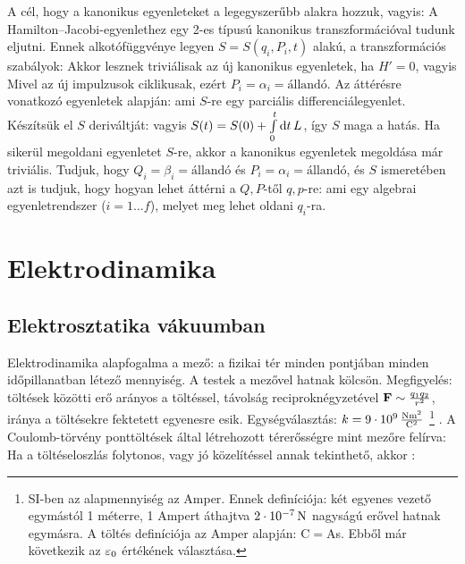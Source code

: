    A cél, hogy a kanonikus egyenleteket a legegyszerűbb alakra hozzuk, vagyis:
   A Hamilton--Jacobi-egyenlethez egy 2-es típusú kanonikus transzformációval tudunk eljutni. Ennek alkotófüggvénye legyen $S=S(q_i,P_i,t)$ alakú, a transzformációs szabályok:
   Akkor lesznek triviálisak az új kanonikus egyenletek, ha $H'=0$, vagyis 
   Mivel az új impulzusok ciklikusak, ezért $P_i=\alpha_i=\text{állandó}$. Az áttérésre vonatkozó egyenletek alapján:
   ami $S$-re egy parciális differenciálegyenlet. Készítsük el $S$ deriváltját:
   vagyis $S(t)=S(0)+\int\limits_{0}^{t}\mathrm{d} t\,L$, így $S$ maga a hatás. Ha sikerül megoldani  egyenletet $S$-re, akkor a kanonikus egyenletek megoldása már triviális. Tudjuk, hogy $Q_i=\beta_i=\text{állandó}$ és $P_i=\alpha_i=\text{állandó}$, és $S$ ismeretében azt is tudjuk, hogy hogyan lehet áttérni a $Q,P$-től $q,p$-re:
   ami egy algebrai egyenletrendszer ($i=1\dots f$), melyet meg lehet oldani $q_i$-ra.
   
 \section{Elektrodinamika}
  
  \subsection{Elektrosztatika vákuumban}\label{ss:01-CoulombMaxwell}
   
   Elektrodinamika alapfogalma a mező: a fizikai tér minden pontjában minden időpillanatban létező mennyiség. A testek a mezővel hatnak kölcsön. Megfigyelés: töltések közötti erő arányos a töltéssel, távolság reciproknégyzetével $\mathbf{F}\sim\frac{q_1q_2}{r^2}$, iránya a töltésekre fektetett egyenesre esik.  Egységválasztás: $k=9\cdot 10^9\mathrm{\, \frac{Nm^2}{C^2}}$
   \footnote{SI-ben az alapmennyiség az Amper. Ennek definíciója: két egyenes vezető egymástól 1 méterre, 1 Ampert áthajtva $2\cdot 10^{-7}\mathrm{\, N}$ nagyságú erővel hatnak egymásra. A töltés definíciója az Amper alapján: C$=$As. Ebből már következik az $\varepsilon_0$ értékének választása.}
   . A Coulomb-törvény ponttöltések által létrehozott térerősségre mint mezőre felírva:
   Ha a töltéseloszlás folytonos, vagy jó közelítéssel annak tekinthető, akkor :
   
